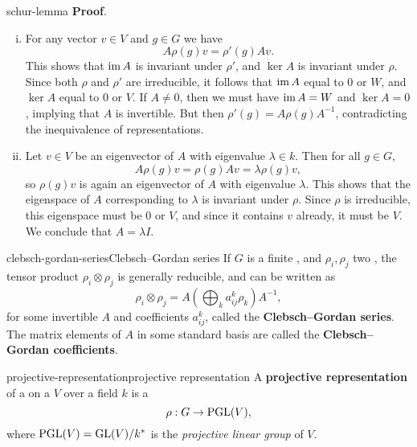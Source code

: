 \begin{example}{schur-lemma}
    \textbf{Proof}.
    \begin{enumerate}[(i)]
        \item For any vector $v \in V$ and $g \in G$ we have
        \[ A \rho(g) v = \rho'(g) A v . \]
        This shows that $\operatorname{im} A$ is invariant under $\rho'$, and $\ker A$ is invariant under $\rho$. Since both $\rho$ and $\rho'$ are irreducible, it follows that $\operatorname{im} A$ equal to $0$ or $W$, and $\ker A$ equal to $0$ or $V$. If $A \ne 0$, then we must have $\operatorname{im} A = W$ and $\ker A = 0$, implying that $A$ is invertible. But then $\rho'(g) = A \rho(g) A^{-1}$, contradicting the inequivalence of representations.
        \item Let $v \in V$ be an eigenvector of $A$ with eigenvalue $\lambda \in k$. Then for all $g \in G$,
        \[ A \rho(g) v = \rho(g) A v = \lambda \rho(g) v , \]
        so $\rho(g) v$ is again an eigenvector of $A$ with eigenvalue $\lambda$. This shows that the eigenspace of $A$ corresponding to $\lambda$ is invariant under $\rho$. Since $\rho$ is irreducible, this eigenspace must be $0$ or $V$, and since it contains $v$ already, it must be $V$. We conclude that $A = \lambda I$.
    \end{enumerate}
\end{example}

\begin{topic}{clebsch-gordan-series}{Clebsch--Gordan series}
    If $G$ is a finite , and $\rho_i, \rho_j$ two  , the tensor product $\rho_i \otimes \rho_j$ is generally reducible, and can be written as
    \[ \rho_i \otimes \rho_j = A \left( \bigoplus_k a^k_{ij} \rho_k \right) A^{-1} , \]
    for some invertible $A$ and coefficients $a^k_{ij}$, called the \textbf{Clebsch--Gordan series}. The matrix elements of $A$ in some standard basis are called the \textbf{Clebsch--Gordan coefficients}.
\end{topic}

\begin{topic}{projective-representation}{projective representation}
    A \textbf{projective representation} of a  on a  $V$ over a field $k$ is a 
    \[ \rho : G \to \textup{PGL}(V) , \]
    where $\textup{PGL}(V) = \textup{GL}(V) / k^*$ is the \textit{projective linear group} of $V$.
\end{topic}

